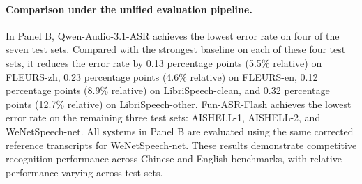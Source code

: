 \documentclass{article}
\begin{document}
\paragraph{Comparison under the unified evaluation pipeline.}
In Panel B, Qwen-Audio-3.1-ASR achieves the lowest error rate on four of the seven test sets. Compared with the strongest baseline on each of these four test sets, it reduces the error rate by 0.13 percentage points (5.5\% relative) on FLEURS-zh, 0.23 percentage points (4.6\% relative) on FLEURS-en, 0.12 percentage points (8.9\% relative) on LibriSpeech-clean, and 0.32 percentage points (12.7\% relative) on LibriSpeech-other. Fun-ASR-Flash achieves the lowest error rate on the remaining three test sets: AISHELL-1, AISHELL-2, and WeNetSpeech-net. All systems in Panel B are evaluated using the same corrected reference transcripts for WeNetSpeech-net. These results demonstrate competitive recognition performance across Chinese and English benchmarks, with relative performance varying across test sets.

%
%
%
%

%
%
%
%
%
%
%
%
%
%
%
%
%

%
%
%
%
%
%
%
%
%

%
%
%
%
%
%
%
%
%

%
%
%
%
%
%
%
%
%

%
%
%
%
%
%
%
%
%

%
%
%
%
%
%
%
%
%

%
%
%
%
%
%
%
%
%

%
%
%
%
%
%
%
%
%

%
%
%
%
%
%
%
%
%

%
%
%
%
\end{document}
